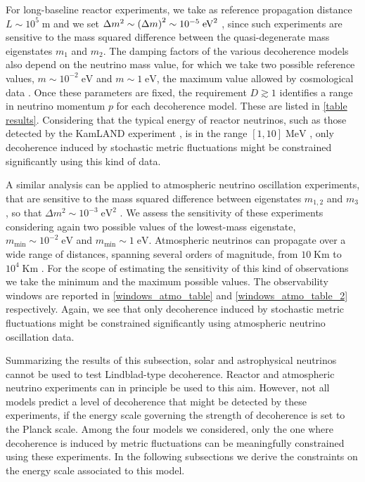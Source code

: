 \documentclass[11pt]{article}
\begin{document}
For long-baseline reactor experiments, we take as reference propagation distance $L\sim 10^5\;\text{m}$ 
and we set $\Delta m^2 \sim \qty(\Delta m)^2 \sim 10^{-5} \;\text{eV}^2$ \cite{KamLAND:2008dgz}, since such experiments are sensitive to the mass squared difference between the quasi-degenerate mass eigenstates $m_1$ and $m_2$. The damping factors of the various decoherence models also depend on the neutrino mass value, for which we take two possible reference values, $m\sim 10^{-2}\;\text{eV}$ and $m \sim 1\;\text{eV}$, the maximum value allowed by cosmological data \cite{DiValentino:2021imh}. Once these parameters are fixed, the requirement $D\gtrsim 1$ identifies a range in neutrino momentum $p$ for each decoherence model. These are listed in \cref{table results}. Considering that the typical energy of reactor neutrinos, such as those detected by the KamLAND experiment \cite{KamLAND:2008dgz}, is in the range $[1,10]\; \text{MeV}$ \cite{KamLAND:2008dgz}, only decoherence induced by stochastic metric fluctuations \cite{Breuer:2008rh} might be constrained significantly using this kind of data. 



A similar analysis can be applied to atmospheric neutrino oscillation experiments, that are sensitive to the mass squared difference between eigenstates $m_{1,2}$ and $m_3$, so that $\Delta m^2 \sim 10^{-3}\;\text{eV}^2$ \cite{Super-Kamiokande:2004orf}. We assess the sensitivity of these experiments considering again two possible values of the lowest-mass eigenstate, $m_{\text{min}} \sim 10^{-2}\;\text{eV}$ and $m_{\text{min}}\sim 1\;\text{eV}$. Atmospheric neutrinos can propagate over a wide range of distances, spanning several orders of magnitude, from $10\;\text{Km}$ to $10^4\;\text{Km}$ \cite{Super-Kamiokande:2004orf}. For the scope of estimating the sensitivity of this kind of observations we take the minimum and the maximum possible values. The observability windows are reported in \cref{windows_atmo_table} and \cref{windows_atmo_table_2} respectively. Again, we see that only decoherence induced by stochastic metric fluctuations \cite{Breuer:2008rh} might be constrained significantly using atmospheric neutrino oscillation data. 

Summarizing the results of this subsection, solar and astrophysical neutrinos cannot be used to test Lindblad-type decoherence. Reactor and atmospheric neutrino experiments can in principle be used to this aim. However, not all models predict a level of decoherence that might be detected by these experiments, if the energy scale governing the strength of decoherence is set to the Planck scale. Among the four models we considered, only the one where decoherence is induced by metric fluctuations can be meaningfully constrained using these experiments. In the following subsections we derive the constraints on the energy scale associated to this model.
\end{document}
